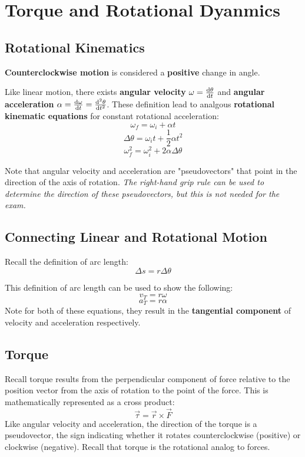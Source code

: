 \documentclass{article}
\begin{document}
\newpage

\section{Torque and Rotational Dyanmics}

\subsection{Rotational Kinematics}
\textbf{Counterclockwise motion} is considered a \textbf{positive} change in angle.

Like linear motion, there exists \textbf{angular velocity} $\omega = \odv{\theta}{t}$ and \textbf{angular acceleration} $\alpha = \odv{\omega}{t} = \odv[2]{\theta}{t}$.
These definition lead to analgous \textbf{rotational kinematic equations} for constant rotational acceleration:
\[\omega_f = \omega_i + \alpha t\]
\[\Delta \theta = \omega_i t + \frac{1}{2} \alpha t^2\]
\[\omega_f^2 = \omega_i^2 + 2 \alpha \Delta \theta\]

Note that angular velocity and acceleration are "pseudovectors" that point in the direction of the axis of rotation.
\textit{The right-hand grip rule can be used to determine the direction of these pseudovectors, but this is not needed for the exam.}

\subsection{Connecting Linear and Rotational Motion}
Recall the definition of arc length:
\[\Delta s = r \Delta \theta\]

This definition of arc length can be used to show the following:
\[v_T = r \omega\]
\[a_T = r \alpha\]
Note for both of these equations, they result in the \textbf{tangential component} of velocity and acceleration respectively.

\subsection{Torque}
Recall torque results from the perpendicular component of force relative to the position vector from the axis of rotation to the point of the force.
This is mathematically represented as a cross product:
\[\vec{\tau} = \vec{r} \times \vec{F}\]
Like angular velocity and acceleration, the direction of the torque is a pseudovector, the sign indicating whether it rotates counterclockwise (positive) or clockwise (negative).
Recall that torque is the rotational analog to forces.
\end{document}
